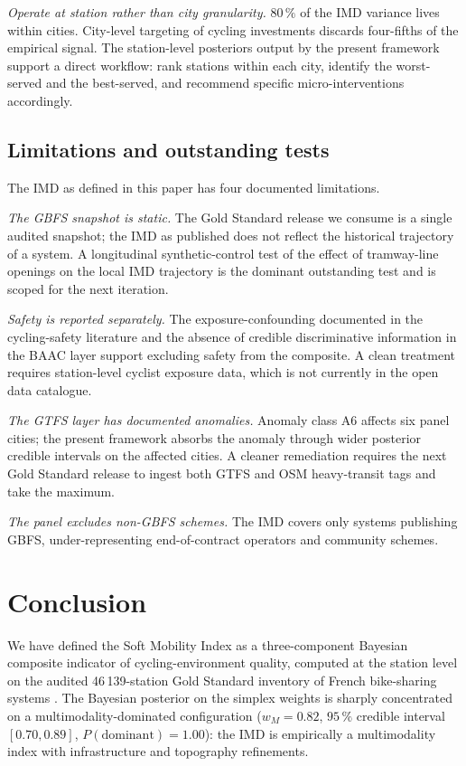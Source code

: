 \documentclass[11pt,a4paper]{article}
\begin{document}
\emph{Operate at station rather than city granularity.}
$80\,\%$ of the IMD variance lives within cities. City-level
targeting of cycling investments discards four-fifths of the
empirical signal. The station-level posteriors output by the
present framework support a direct workflow: rank stations
within each city, identify the worst-served and the
best-served, and recommend specific micro-interventions
accordingly.

\subsection{Limitations and outstanding tests}

The IMD as defined in this paper has four documented
limitations.

\emph{The GBFS snapshot is static.}
The Gold Standard release we consume is a single audited
snapshot; the IMD as published does not reflect the historical
trajectory of a system. A longitudinal synthetic-control test
of the effect of tramway-line openings on the local IMD
trajectory is the dominant outstanding test and is scoped for
the next iteration.

\emph{Safety is reported separately.}
The exposure-confounding documented in the cycling-safety
literature \citep{Reynolds2009, Schepers2014} and the absence
of credible discriminative information in the BAAC layer
support excluding safety from the composite. A clean treatment
requires station-level cyclist exposure data, which is not
currently in the open data catalogue.

\emph{The GTFS layer has documented anomalies.}
Anomaly class A6 affects six panel cities; the present
framework absorbs the anomaly through wider posterior
credible intervals on the affected cities. A cleaner
remediation requires the next Gold Standard release to ingest
both GTFS and OSM heavy-transit tags and take the maximum.

\emph{The panel excludes non-GBFS schemes.}
The IMD covers only systems publishing GBFS, under-representing
end-of-contract operators and community schemes.

\section{Conclusion}
\label{sec:conclusion}

We have defined the Soft Mobility Index as a three-component
Bayesian composite indicator of cycling-environment quality,
computed at the station level on the audited 46\,139-station
Gold Standard inventory of French bike-sharing systems
\citep{Fosse2026gold}. The Bayesian posterior on the simplex
weights is sharply concentrated on a multimodality-dominated
configuration ($w_M = 0.82$, $95\,\%$ credible interval
$[0.70, 0.89]$, $P(\text{dominant}) = 1.00$): the IMD is
empirically a multimodality index with infrastructure and
topography refinements.
\end{document}

